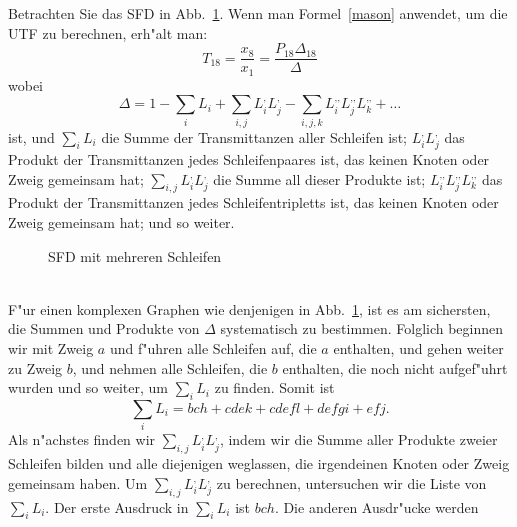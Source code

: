 \clearpage\vspace*{-9mm}
\bsp{} Betrachten Sie das SFD in Abb.~\ref{SFD22}. Wenn man
Formel~\ref{mason} anwendet, um die UTF zu berechnen, erh"alt man:
\begin{equation*}
  T_{18} = \frac{x_8}{x_1} = \frac{P_{18}\Delta_{18}}{\Delta}
\end{equation*}
wobei 
\begin{equation*}
  \Delta = 1 - \sum\limits_i L_i + \sum\limits_{i,j}L_i^{\mbox{,}}L_j^{\mbox{,}}-\sum\limits_{i,j,k}L_i^{\mbox{,,}}L_j^{\mbox{,,}}L_k^{\mbox{,,}}+\ldots
\end{equation*}
ist, und $\sum\limits_i L_i $ die Summe
der Transmittanzen aller Schleifen ist; $L_i^{\mbox{,}}L_j^{\mbox{,}}$ das Produkt der
Transmittanzen jedes Schleifenpaares ist, das keinen Knoten oder Zweig
gemeinsam hat; $\sum\limits_{i,j}L_i^{\mbox{,}}L_j^{\mbox{,}}$ die Summe all dieser Produkte ist; $L_i^{\mbox{,,}}L_j^{\mbox{,,}}L_k^{\mbox{,,}}$ das
Produkt der Transmittanzen jedes Schleifentripletts ist, das keinen
Knoten oder Zweig gemeinsam hat; und so weiter. \\
\begin{figure}[htb!]
\vspace*{-3mm}\begin{center}
  \caption{SFD mit mehreren Schleifen}\label{SFD22}
\end{center}\vspace*{-9mm}
\end{figure}\\
\nit F"ur einen komplexen Graphen wie denjenigen in Abb.~\ref{SFD22}, ist
es am sichersten, die Summen und Produkte von $\Delta$ systematisch zu
bestimmen. Folglich beginnen wir mit Zweig $a$ und f"uhren alle
Schleifen auf, die $a$ enthalten, und gehen weiter zu Zweig $b$, und
nehmen alle Schleifen, die $b$ enthalten, die noch nicht aufgef"uhrt
wurden und so weiter, um $\sum\limits_i L_i$ zu finden. Somit ist 
\begin{equation*}
 \sum\limits_i L_i = bch + cdek + cdefl + defgi + efj.
\end{equation*}
Als n"achstes finden wir
$\sum\limits_{i,j}L_i^{\mbox{,}}L_j^{\mbox{,}}$, indem wir die Summe
aller Produkte zweier Schleifen bilden und alle diejenigen weglassen,
die irgendeinen Knoten oder Zweig gemeinsam haben. Um
$\sum\limits_{i,j}L_i^{\mbox{,}}L_j^{\mbox{,}}$ zu berechnen,
untersuchen wir die Liste von $\sum\limits_i L_i$. Der erste Ausdruck
in $\sum\limits_i L_i$ ist $bch$. Die anderen Ausdr"ucke werden
